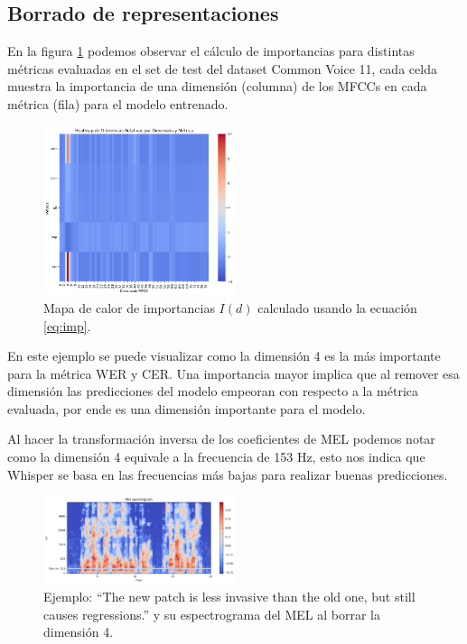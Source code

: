 \documentclass[conference]{IEEEtran}
\begin{document}
\subsection{Borrado de representaciones}

En la figura \ref{fig:cv_imp} podemos observar el cálculo de importancias para distintas métricas evaluadas en el set de test del dataset Common Voice 11, cada celda muestra la importancia de una dimensión (columna) de los MFCCs en cada métrica (fila) para el modelo entrenado.

\begin{figure}[H]
\centering
\includegraphics[width=0.5\textwidth]{images/importance_plot.png}
\caption{Mapa de calor de importancias $I(d)$ calculado usando la ecuación \ref{eq:imp}.}
\label{fig:cv_imp}
\end{figure}

En este ejemplo se puede visualizar como la dimensión 4 es la más importante para la métrica WER y CER.
Una importancia mayor implica que al remover esa dimensión las predicciones del modelo empeoran con respecto a la métrica evaluada, por ende es una dimensión importante para el modelo.

Al hacer la transformación inversa de los coeficientes de MEL podemos notar como la dimensión 4 equivale a la frecuencia de 153 Hz, esto nos indica que Whisper se basa en las frecuencias más bajas para realizar buenas predicciones.
\begin{figure}[H]
\centering
\includegraphics[width=0.5\textwidth]{images/dim_4_erasured.png}
\caption{Ejemplo: “The new patch is less invasive than the old one, but still causes regressions.” y su espectrograma del MEL al borrar la dimensión 4.}
\label{fig:mel_erasure_dim_4}
\end{figure}
\end{document}
